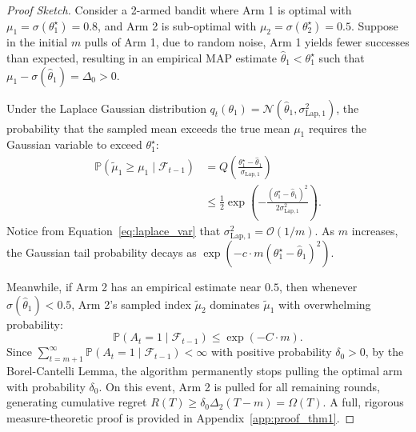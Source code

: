 \documentclass[twoside]{article}
\begin{document}
\begin{proof}[Proof Sketch]
Consider a 2-armed bandit where Arm 1 is optimal with $\mu_1 = \sigma(\theta_1^\star) = 0.8$, and Arm 2 is sub-optimal with $\mu_2 = \sigma(\theta_2^\star) = 0.5$. Suppose in the initial $m$ pulls of Arm 1, due to random noise, Arm 1 yields fewer successes than expected, resulting in an empirical MAP estimate $\hat{\theta}_1 < \theta_1^\star$ such that $\mu_1 - \sigma(\hat{\theta}_1) = \Delta_0 > 0$.

Under the Laplace Gaussian distribution $q_t(\theta_1) = \mathcal{N}(\hat{\theta}_1, \sigma_{\text{Lap}, 1}^2)$, the probability that the sampled mean exceeds the true mean $\mu_1$ requires the Gaussian variable to exceed $\theta_1^\star$:
\begin{equation}
\begin{aligned}
\mathbb{P}\left(\tilde{\mu}_1 \ge \mu_1 \mid \mathcal{F}_{t-1}\right) &= Q\left( \frac{\theta_1^\star - \hat{\theta}_1}{\sigma_{\text{Lap}, 1}} \right) \\
&\le \frac{1}{2} \exp\left( - \frac{(\theta_1^\star - \hat{\theta}_1)^2}{2 \sigma_{\text{Lap}, 1}^2} \right).
\end{aligned}
\end{equation}
Notice from Equation~\eqref{eq:laplace_var} that $\sigma_{\text{Lap}, 1}^2 = \mathcal{O}(1/m)$. As $m$ increases, the Gaussian tail probability decays as $\exp(- c \cdot m (\theta_1^\star - \hat{\theta}_1)^2)$. 

Meanwhile, if Arm 2 has an empirical estimate near $0.5$, then whenever $\sigma(\hat{\theta}_1) < 0.5$, Arm 2's sampled index $\tilde{\mu}_2$ dominates $\tilde{\mu}_1$ with overwhelming probability:
\begin{equation}
\mathbb{P}(A_t = 1 \mid \mathcal{F}_{t-1}) \le \exp(- C \cdot m).
\end{equation}
Since $\sum_{t=m+1}^\infty \mathbb{P}(A_t = 1 \mid \mathcal{F}_{t-1}) < \infty$ with positive probability $\delta_0 > 0$, by the Borel-Cantelli Lemma, the algorithm permanently stops pulling the optimal arm with probability $\delta_0$. On this event, Arm 2 is pulled for all remaining rounds, generating cumulative regret $R(T) \ge \delta_0 \Delta_2 (T - m) = \Omega(T)$. A full, rigorous measure-theoretic proof is provided in Appendix~\ref{app:proof_thm1}.
\end{proof}
\end{document}
